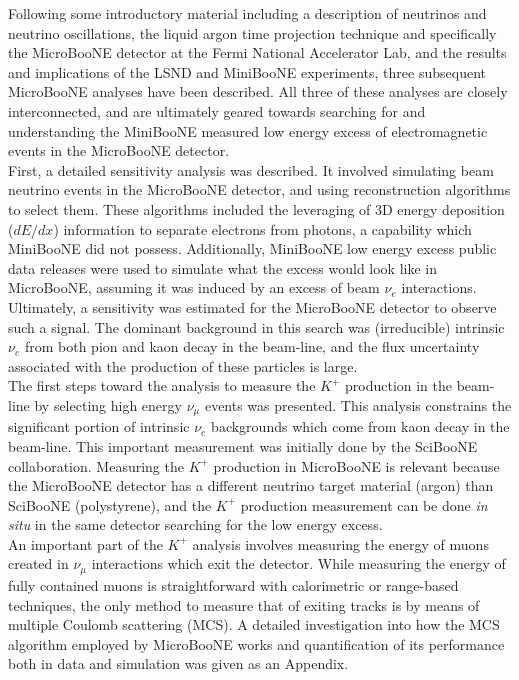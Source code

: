 Following some introductory material including a description of neutrinos and neutrino oscillations, the liquid argon time projection technique and specifically the MicroBooNE detector at the Fermi National Accelerator Lab, and the results and implications of the LSND and MiniBooNE experiments, three subsequent MicroBooNE analyses have been described. All three of these analyses are closely interconnected, and are ultimately geared towards searching for and understanding the MiniBooNE measured low energy excess of electromagnetic events in the MicroBooNE detector.\\

First, a detailed sensitivity analysis was described. It involved simulating beam neutrino events in the MicroBooNE detector, and using reconstruction algorithms to select them. These algorithms included the leveraging of 3D energy deposition ($dE/dx$) information to separate electrons from photons, a capability which MiniBooNE did not possess. Additionally, MiniBooNE low energy excess public data releases were used to simulate what the excess would look like in MicroBooNE, assuming it was induced by an excess of beam $\nu_e$ interactions. Ultimately, a sensitivity was estimated for the MicroBooNE detector to observe such a signal. The dominant background in this search was (irreducible) intrinsic $\nu_e$ from both pion and kaon decay in the beam-line, and the flux uncertainty associated with the production of these particles is large.\\

The first steps toward the analysis to measure the $K^+$ production in the beam-line by selecting high energy $\nu_\mu$ events was presented. This analysis constrains the significant portion of intrinsic $\nu_e$ backgrounds which come from kaon decay in the beam-line. This important measurement was initially done by the SciBooNE collaboration. Measuring the $K^+$ production in MicroBooNE is relevant because the MicroBooNE detector has a different neutrino target material (argon) than SciBooNE (polystyrene), and the $K^+$ production measurement can be done \textit{in situ} in the same detector searching for the low energy excess.\\

An important part of the $K^+$ analysis involves measuring the energy of muons created in $\nu_\mu$ interactions which exit the detector. While measuring the energy of fully contained muons is straightforward with calorimetric or range-based techniques, the only method to measure that of exiting tracks is by means of multiple Coulomb scattering (MCS). A detailed investigation into how the MCS algorithm employed by MicroBooNE works and quantification of its performance both in data and simulation was given as an Appendix.\\

